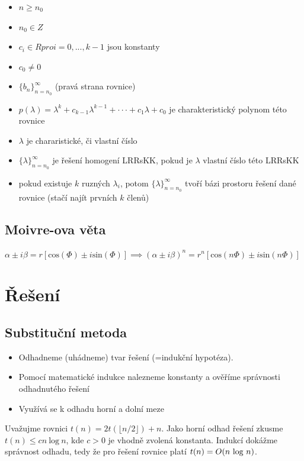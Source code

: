 \documentclass{szzclass}
\begin{document}
\begin{itemize}
    \item $n \geq n_0$
    \item $n_0 \in Z$
    \item $c_i \in R pro i = 0, . . . , k − 1$ jsou konstanty
    \item $c_0 \neq 0$
    \item $\{b_n\}^\infty_{n = n_0}$ (pravá strana rovnice)
    \item $p(\lambda) = \lambda^k + c_{k−1}\lambda^{k−1} + · · · + c_1\lambda + c_0$ je charakteristický polynom této rovnice
    \item $\lambda$ je chararistické, či vlastní číslo
    \item $\{\lambda\}^\infty_{n = n_0}$ je řešení homogení LRRsKK, pokud je $\lambda$ vlastní číslo této LRRsKK
    \item pokud existuje $k$ ruzných $\lambda_i$, potom $\{\lambda\}^\infty_{n = n_0}$ tvoří bázi prostoru řešení dané rovnice (stačí najít prvních $k$ členů)
\end{itemize}



\subsection{Moivre-ova věta}
$\alpha \pm i\beta = r[\text{cos}(\Phi) \pm i\text{sin}(\Phi)] \implies (\alpha \pm i\beta)^n = r^n[\text{cos}(n\Phi) \pm i\text{sin}(n\Phi)]$


\newpage

\section{Řešení}

\subsection{Substituční metoda}

\begin{itemize}
    \item Odhadneme (uhádneme) tvar řešení (=indukční hypotéza).
    \item Pomocí matematické indukce nalezneme konstanty a ověříme
    správnosti odhadnutého řešení
    \item Využívá se k odhadu horní a dolní meze
\end{itemize}

Uvažujme rovnici $t(n) = 2t(\lfloor n/2 \rfloor) + n$.
Jako horní odhad řešení zkusme
$t(n) \leq cn~\text{log}~n$, kde $c > 0$ je vhodně zvolená konstanta.
Indukcí dokážme správnost odhadu, tedy že pro řešení rovnice platí
$t(n) =\nolinebreak O(n~\text{log}~n)$.
\end{document}
